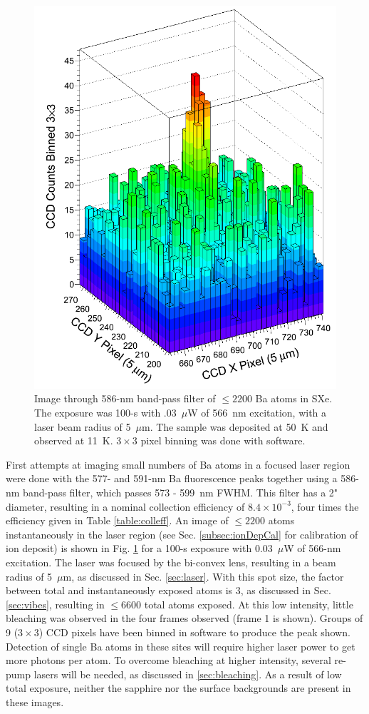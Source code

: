 \begin{figure} %
        \centering
                \includegraphics[width=.6\textwidth]{figures/image_1e4.png}
                \caption{Image through 586-nm band-pass filter of $\leq 2200$ Ba atoms in SXe.  The exposure was 100-s with .03~$\mu$W of 566~nm excitation, with a laser beam radius of 5~$\mu$m.  The sample was deposited at 50~K and observed at 11~K.  $3 \times 3$ pixel binning was done with software.}
\label{fig:image590s}
\end{figure}

First attempts at imaging small numbers of Ba atoms in a focused laser region were done with the 577- and 591-nm Ba fluorescence peaks together using a 586-nm band-pass filter, which passes 573 - 599~nm FWHM.  This filter has a 2" diameter, resulting in a nominal collection efficiency of $8.4 \times 10^{-3}$, four times the efficiency given in Table \ref{table:colleff}.  An image of $\leq 2200$ atoms instantaneously in the laser region (see Sec. \ref{subsec:ionDepCal} for calibration of ion deposit) is shown in Fig. \ref{fig:image590s} for a 100-s exposure with 0.03~$\mu$W of 566-nm excitation.  The laser was focused by the bi-convex lens, resulting in a beam radius of 5~$\mu$m, as discussed in Sec. \ref{sec:laser}.  With this spot size, the factor between total and instantaneously exposed atoms is 3, as discussed in Sec. \ref{sec:vibes}, resulting in $\leq 6600$ total atoms exposed.  At this low intensity, little bleaching was observed in the four frames observed (frame 1 is shown).  Groups of 9 ($3 \times 3$) CCD pixels have been binned in software to produce the peak shown.  Detection of single Ba atoms in these sites will require higher laser power to get more photons per atom.  To overcome bleaching at higher intensity, several re-pump lasers will be needed, as discussed in \ref{sec:bleaching}.  As a result of low total exposure, neither the sapphire nor the surface backgrounds are present in these images. 

